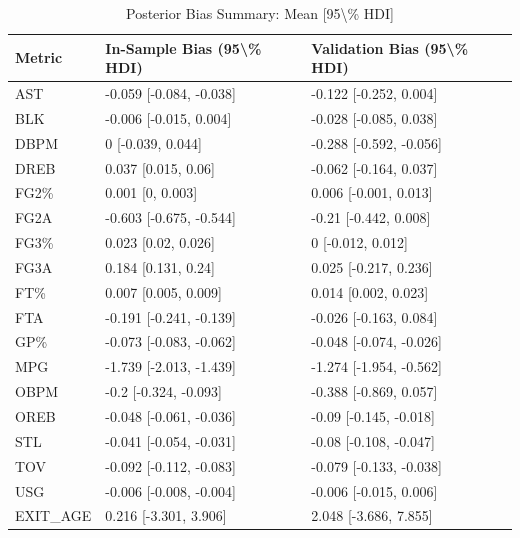 \begin{table}[t]
\caption*{
{\fontsize{20}{25}\selectfont  Posterior Bias Summary: Mean [95\textbackslash{}\% HDI]\fontsize{12}{15}\selectfont }
} 
\fontsize{12.0pt}{14.0pt}\selectfont
\begin{tabular*}{\linewidth}{@{\extracolsep{\fill}}lll}
\toprule
Metric & In-Sample Bias (95\textbackslash{}\% HDI) & Validation Bias (95\textbackslash{}\% HDI) \\ 
\midrule\addlinespace[2.5pt]
AST & -0.059 [-0.084, -0.038] & -0.122 [-0.252, 0.004] \\ 
BLK & -0.006 [-0.015, 0.004] & -0.028 [-0.085, 0.038] \\ 
DBPM & 0 [-0.039, 0.044] & -0.288 [-0.592, -0.056] \\ 
DREB & 0.037 [0.015, 0.06] & -0.062 [-0.164, 0.037] \\ 
FG2\% & 0.001 [0, 0.003] & 0.006 [-0.001, 0.013] \\ 
FG2A & -0.603 [-0.675, -0.544] & -0.21 [-0.442, 0.008] \\ 
FG3\% & 0.023 [0.02, 0.026] & 0 [-0.012, 0.012] \\ 
FG3A & 0.184 [0.131, 0.24] & 0.025 [-0.217, 0.236] \\ 
FT\% & 0.007 [0.005, 0.009] & 0.014 [0.002, 0.023] \\ 
FTA & -0.191 [-0.241, -0.139] & -0.026 [-0.163, 0.084] \\ 
GP\% & -0.073 [-0.083, -0.062] & -0.048 [-0.074, -0.026] \\ 
MPG & -1.739 [-2.013, -1.439] & -1.274 [-1.954, -0.562] \\ 
OBPM & -0.2 [-0.324, -0.093] & -0.388 [-0.869, 0.057] \\ 
OREB & -0.048 [-0.061, -0.036] & -0.09 [-0.145, -0.018] \\ 
STL & -0.041 [-0.054, -0.031] & -0.08 [-0.108, -0.047] \\ 
TOV & -0.092 [-0.112, -0.083] & -0.079 [-0.133, -0.038] \\ 
USG & -0.006 [-0.008, -0.004] & -0.006 [-0.015, 0.006] \\ 
EXIT\_AGE & 0.216 [-3.301, 3.906] & 2.048 [-3.686, 7.855] \\ 
\bottomrule
\end{tabular*}
\end{table}

